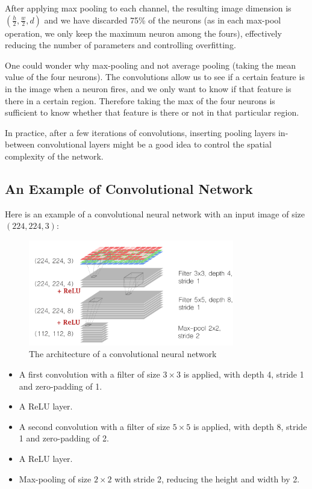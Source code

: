 After applying max pooling to each channel, the resulting image dimension is $(\frac{h}{2}, \frac{w}{2}, d)$ and we have discarded 75\% of the neurons (as in each max-pool operation, we only keep the maximum neuron among the fours), effectively reducing the number of parameters and controlling overfitting.

One could wonder why max-pooling and not average pooling (taking the mean value of the four neurons). The convolutions allow us to see if a certain feature is in the image when a neuron fires, and we only want to know if that feature is there in a certain region. Therefore taking the max of the four neurons is sufficient to know whether that feature is there or not in that particular region.

In practice, after a few iterations of convolutions, inserting pooling layers in-between convolutional layers might be a good idea to control the spatial complexity of the network.

\subsection{An Example of Convolutional Network}
Here is an example of a convolutional neural network with an input image of size $(224, 224, 3)$:

\begin{figure}[H]
\centering
\includegraphics[width=0.8\textwidth]{Images/conv_archi.png}
\caption{The architecture of a convolutional neural network \cite{gorner}}
\end{figure}

\begin{itemize}
    \item A first convolution with a filter of size $3\times3$ is applied, with depth 4, stride 1 and zero-padding of 1.
    \item A ReLU layer.
    \item A second convolution with a filter of size $5\times5$ is applied, with depth 8, stride 1 and zero-padding of 2.
    \item A ReLU layer.
    \item Max-pooling of size $2\times2$ with stride 2, reducing the height and width by 2.
\end{itemize}

